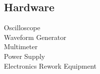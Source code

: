 \documentclass[]{deedy-resume-openfont}
\begin{document}
\begin{minipage}[t]{0.33\textwidth}
\subsection{Hardware}
Oscilloscope\\
Waveform Generator\\
Multimeter \\
Power Supply \\
Electronics Rework Equipment \\
\sectionsep



%
%

\end{minipage} 
\hfill
\end{document}
